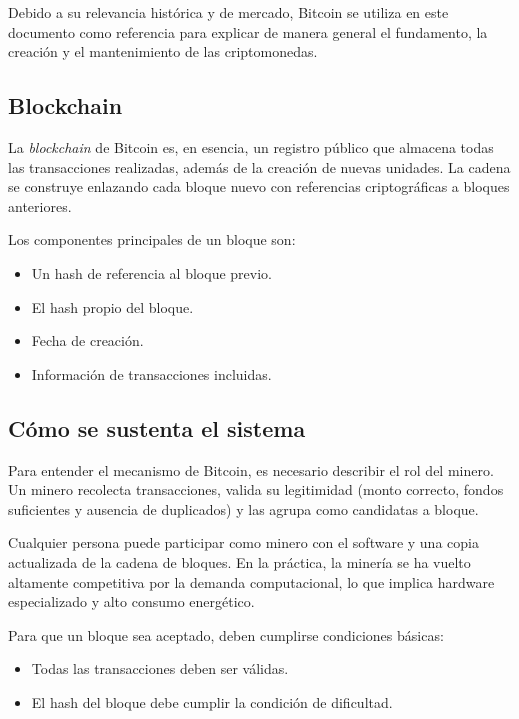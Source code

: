 Debido a su relevancia histórica y de mercado, Bitcoin se utiliza en
este documento como referencia para explicar de manera general el
fundamento, la creación y el mantenimiento de las criptomonedas.

\subsection{Blockchain}

La \textit{blockchain} de Bitcoin es, en esencia, un registro público
que almacena todas las transacciones realizadas, además de la creación
de nuevas unidades. La cadena se construye enlazando cada bloque nuevo
con referencias criptográficas a bloques anteriores.

Los componentes principales de un bloque son:

\begin{itemize}
  \item Un hash de referencia al bloque previo.
  \item El hash propio del bloque.
  \item Fecha de creación.
  \item Información de transacciones incluidas.
\end{itemize}

\subsection{Cómo se sustenta el sistema}

Para entender el mecanismo de Bitcoin, es necesario describir el rol
del minero. Un minero recolecta transacciones, valida su legitimidad
(monto correcto, fondos suficientes y ausencia de duplicados) y las
agrupa como candidatas a bloque.

Cualquier persona puede participar como minero con el software y una
copia actualizada de la cadena de bloques. En la práctica, la minería
se ha vuelto altamente competitiva por la demanda computacional, lo
que implica hardware especializado y alto consumo energético.

Para que un bloque sea aceptado, deben cumplirse condiciones básicas:

\begin{itemize}
  \item Todas las transacciones deben ser válidas.
  \item El hash del bloque debe cumplir la condición de dificultad.
\end{itemize}

